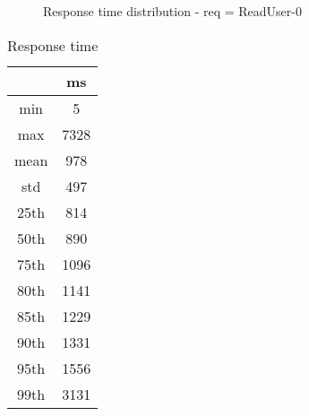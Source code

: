 \begin{minipage}{0.75\linewidth}
\begin{figure}[h]
\begin{adjustbox}{max width=1.0\linewidth, keepaspectratio}
  \end{adjustbox}
  \caption{Response time distribution - req = ReadUser-0}
\end{figure}
\end{minipage}\hfill\begin{minipage}{0.18\linewidth}
\begin{table}[h]
\begin{tabular}{|cc|}
\hline
\textbf{} & \textbf{ms}\\ \hline
 \Xhline{0.005\arrayrulewidth}
min & 5\\
 \Xhline{0.005\arrayrulewidth}
max & 7328\\
 \Xhline{0.005\arrayrulewidth}
mean & 978\\
 \Xhline{0.005\arrayrulewidth}
std & 497\\
\hline
\hline
 \Xhline{0.005\arrayrulewidth}
25th & 814\\
 \Xhline{0.005\arrayrulewidth}
50th & 890\\
 \Xhline{0.005\arrayrulewidth}
75th & 1096\\
 \Xhline{0.005\arrayrulewidth}
80th & 1141\\
 \Xhline{0.005\arrayrulewidth}
85th & 1229\\
 \Xhline{0.005\arrayrulewidth}
90th & 1331\\
 \Xhline{0.005\arrayrulewidth}
95th & 1556\\
 \Xhline{0.005\arrayrulewidth}
99th & 3131\\
\hline
\end{tabular}
\caption{Response time}
\end{table}
\end{minipage}\hfill